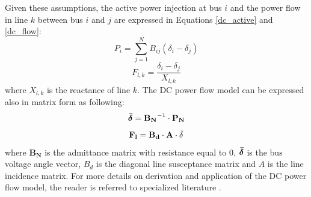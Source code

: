 \documentclass[review]{elsarticle}
\begin{document}
Given these assumptions, the active power injection at bus $i$ and the power flow in line $k$ between bus $i$ and $j$ are expressed in Equations \ref{dc_active} and \ref{dc_flow}:
    \begin{equation}
        P_{i} = \sum_{j=1}^N B_{ij}(\delta_i - \delta_j)
    \label{dc_active}
    \end{equation}
    \begin{equation}
        F_{l,k} = \frac{\delta_i - \delta_j}{X_{l,k}}
        \label{dc_flow}
    \end{equation}
where $X_{l,k}$ is the reactance of line $k$. The DC power flow model can be expressed also in matrix form as following:
\begin{equation}
    \boldsymbol{\Bar{\delta}} = \mathbf{B_N}^{-1}\cdot \mathbf{P_N}
\end{equation}
\begin{equation}
    \mathbf{F_l} = \mathbf{B_d}\cdot\mathbf{A}\cdot \Bar{\delta}
\end{equation}
where $\mathbf{B_N}$ is the admittance matrix with resistance equal to 0, $\boldsymbol{\Bar{\delta}}$ is the bus voltage angle vector, $B_d$ is the diagonal line susceptance matrix and $A$ is the line incidence matrix. For more details on derivation and application of the DC power flow model, the reader is referred to specialized literature \cite{grainger2003power, van2014dc, glover2012power, glover2012power, li2014risk}. 





%
%
%


\printbibliography
\end{document}
